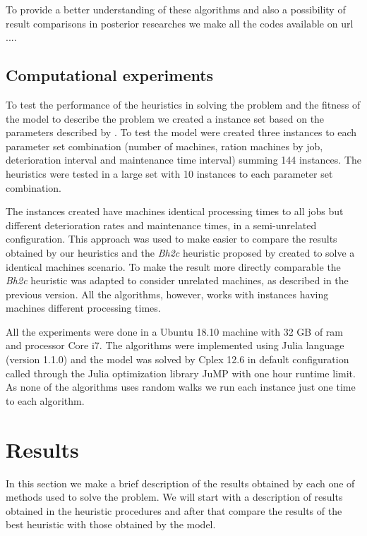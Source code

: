\documentclass[a4paper,11pt]{article}
\begin{document}
To provide a better understanding of these algorithms and also a possibility of result comparisons in posterior researches we make all the codes available on url ....

\subsection{Computational experiments}

To test the performance of the heuristics in solving the problem and the fitness of the model to describe the problem we created a instance set based on the parameters described by \cite{ruiz2017makespan}. To test the model were created three instances to each parameter set combination (number of machines, ration machines by job, deterioration interval and maintenance time interval) summing 144 instances. The heuristics were tested in a large set with 10 instances to each parameter set combination.

The instances created have machines identical processing times to all jobs but different deterioration rates and maintenance times, in a semi-unrelated configuration. This approach was used to make easier to compare the results obtained by our heuristics and the \emph{Bh2c} heuristic proposed by \cite{ruiz2017makespan} created to solve a identical machines scenario. To make the result more directly comparable the \emph{Bh2c} heuristic was adapted to consider unrelated machines, as described in the previous version. All the algorithms, however, works with instances having machines different processing times.  

All the experiments were done in a Ubuntu 18.10 machine with 32 GB of ram and processor Core i7. The algorithms were implemented using Julia language (version 1.1.0) and the model was solved by Cplex 12.6 in default configuration called through the Julia optimization library JuMP with one hour runtime limit. As none of the algorithms uses random walks we run each instance just one time to each algorithm. 

\section{Results}

In this section we make a brief description of the results obtained by each one of methods used to solve the problem. We will start with a description of results obtained in the heuristic procedures and after that compare the results of the best heuristic with those obtained by the model. 
\end{document}
